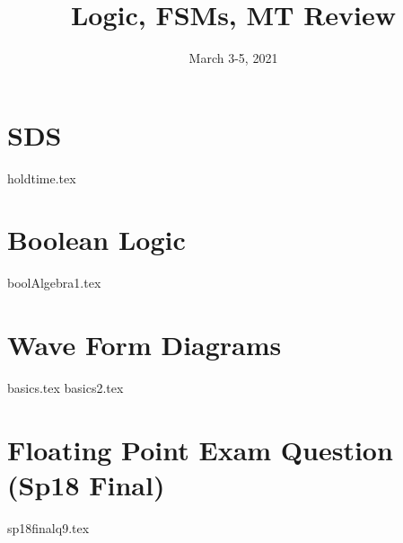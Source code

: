 \documentclass[11pt]{exam}
\title{Logic, FSMs, MT Review}
\date{March 3-5, 2021}
\begin{document}
\maketitle

\section{SDS}
\begin{questions}
{holdtime.tex}
\end{questions}
\newpage


\section{Boolean Logic}
\begin{questions}
{boolAlgebra1.tex}
\end{questions}
\newpage

\section{Wave Form Diagrams}
\begin{questions}
{basics.tex}
{basics2.tex}
\end{questions}
\newpage

\section{Floating Point Exam Question (Sp18 Final)}
\begin{questions}
{sp18finalq9.tex}
\end{questions}
\newpage


\end{document}
